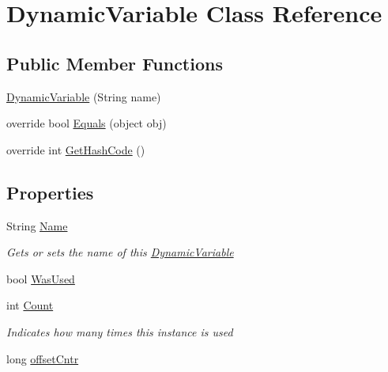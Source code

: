 \hypertarget{class_microchip_1_1_dynamic_variable}{}\section{Dynamic\+Variable Class Reference}
\label{class_microchip_1_1_dynamic_variable}
\subsection*{Public Member Functions}
\begin{DoxyCompactItemize}
\item 
\hyperlink{class_microchip_1_1_dynamic_variable_ad3f3b789633d79b139a9ce5c99083fbd}{Dynamic\+Variable} (String name)
\item 
override bool \hyperlink{class_microchip_1_1_dynamic_variable_aadf763f0213fc2f3875230b06bb0b6cf}{Equals} (object obj)
\item 
override int \hyperlink{class_microchip_1_1_dynamic_variable_a77e1afa2b6dee1ed3640da81d7407b42}{Get\+Hash\+Code} ()
\end{DoxyCompactItemize}
\subsection*{Properties}
\begin{DoxyCompactItemize}
\item 
String \hyperlink{class_microchip_1_1_dynamic_variable_a934fa09ba291a97f43720640e4d83f25}{Name}
\begin{DoxyCompactList}\small\item\em Gets or sets the name of this \hyperlink{class_microchip_1_1_dynamic_variable}{Dynamic\+Variable} \end{DoxyCompactList}\item 
bool \hyperlink{class_microchip_1_1_dynamic_variable_af7928a8976847da930bdabe61a1d69cb}{Was\+Used}
\item 
int \hyperlink{class_microchip_1_1_dynamic_variable_aad462966ed963f892117056de1eba502}{Count}
\begin{DoxyCompactList}\small\item\em Indicates how many times this instance is used \end{DoxyCompactList}\item 
long \hyperlink{class_microchip_1_1_dynamic_variable_a55857d3965a9d433905e7dae69121204}{offset\+Cntr}
\end{DoxyCompactItemize}


